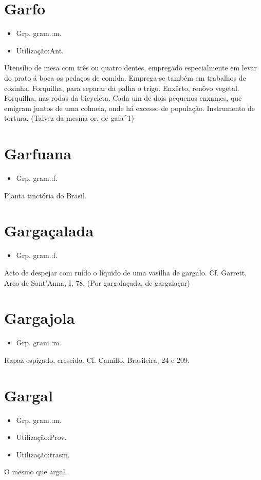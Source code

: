 \section{Garfo}
\begin{itemize}
\item {Grp. gram.:m.}
\end{itemize}
\begin{itemize}
\item {Utilização:Ant.}
\end{itemize}
Utensílio de mesa com três ou quatro dentes, empregado especialmente em levar do prato á boca os pedaços de comida.
Emprega-se também em trabalhos de cozinha.
Forquilha, para separar da palha o trigo.
Enxêrto, renôvo vegetal.
Forquilha, nas rodas da bicycleta.
Cada um de dois pequenos enxames, que emigram juntos de uma colmeia, onde há excesso de população.
Instrumento de tortura.
(Talvez da mesma or. de \textunderscore gafa\textunderscore ^1)
\section{Garfuana}
\begin{itemize}
\item {Grp. gram.:f.}
\end{itemize}
Planta tinctória do Brasil.
\section{Gargaçalada}
\begin{itemize}
\item {Grp. gram.:f.}
\end{itemize}
Acto de despejar com ruído o líquido de uma vasilha de gargalo. Cf. Garrett, \textunderscore Arco de Sant'Anna\textunderscore , I, 78.
(Por \textunderscore gargalaçada\textunderscore , de \textunderscore gargalaçar\textunderscore )
\section{Gargajola}
\begin{itemize}
\item {Grp. gram.:m.}
\end{itemize}
Rapaz espigado, crescido. Cf. Camillo, \textunderscore Brasileira\textunderscore , 24 e 209.
\section{Gargal}
\begin{itemize}
\item {Grp. gram.:m.}
\end{itemize}
\begin{itemize}
\item {Utilização:Prov.}
\end{itemize}
\begin{itemize}
\item {Utilização:trasm.}
\end{itemize}
O mesmo que \textunderscore argal\textunderscore .
